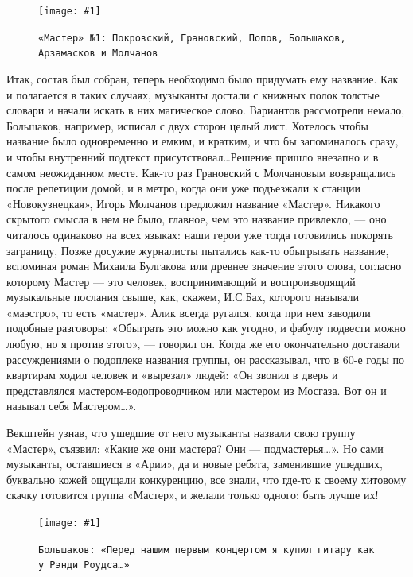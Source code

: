 \documentclass[10pt, twoside]{book}
\newcommand{\myincludegraphics}[1]{\texttt{[image: \#1]}}
\begin{document}
\begin{figure}[h]
    \centering
    \myincludegraphics{Image16}
    \caption{\texttt{«Мастер» №1: Покровский, Грановский, Попов, Большаков, Арзамасков и Молчанов}}
\end{figure}

Итак, состав был собран, теперь необходимо было придумать ему название. Как и полагается в таких случаях, музыканты
достали с книжных полок толстые словари и начали искать в них магическое слово. Вариантов рассмотрели немало, Большаков,
например, исписал с двух сторон целый лист. Хотелось чтобы название было одновременно и емким, и кратким, и что бы
запоминалось сразу, и чтобы внутренний подтекст присутствовал\ldots Решение пришло внезапно и в самом неожиданном месте.
Как-то раз Грановский с Молчановым возвращались после репетиции домой, и в метро, когда они уже подъезжали к станции
«Новокузнецкая», Игорь Молчанов предложил название «Мастер». Никакого скрытого смысла в нем не было, главное, чем это
название привлекло, — оно читалось одинаково на всех языках: наши герои уже тогда готовились покорять заграницу, Позже
досужие журналисты пытались как-то обыгрывать название, вспоминая роман Михаила Булгакова или древнее значение этого
слова, согласно которому Мастер — это человек, воспринимающий и воспроизводящий музыкальные послания свыше, как, скажем,
И.С.Бах, которого называли «маэстро», то есть «мастер». Алик всегда ругался, когда при нем заводили подобные разговоры:
«Обыграть это можно как угодно, и фабулу подвести можно любую, но я против этого», — говорил он. Когда же его
окончательно доставали рассуждениями о подоплеке названия группы, он рассказывал, что в 60-е годы по квартирам ходил
человек и «вырезал» людей: «Он звонил в дверь и представлялся мастером-водопроводчиком или мастером из Мосгаза. Вот он и
называл себя Мастером\ldots».

Векштейн узнав, что ушедшие от него музыканты назвали свою группу «Мастер», съязвил: «Какие же они мастера? Они —
подмастерья\ldots». Но сами музыканты, оставшиеся в «Арии», да и новые ребята, заменившие ушедших, буквально кожей
ощущали конкуренцию, все знали, что где-то к своему хитовому скачку готовится группа «Мастер», и желали только одного:
быть лучше их!

\begin{figure}
    \centering
    \myincludegraphics{Image17}
    \caption{\texttt{Большаков: «Перед нашим первым концертом я купил гитару как у Рэнди Роудса\ldots»}}
\end{figure}
\end{document}
